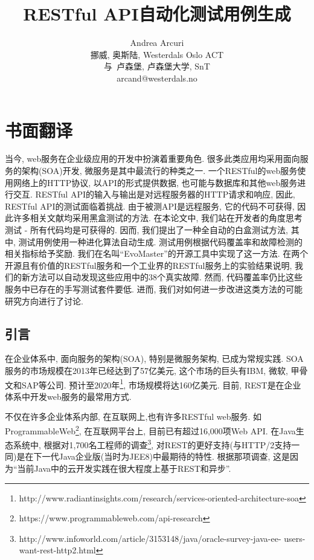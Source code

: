 \chapter{书面翻译}

\title{RESTful API自动化测试用例生成}

\author{Andrea Arcuri\\挪威, 奥斯陆, Westerdals Oslo ACT\\与\ 卢森堡, 卢森堡大学, SnT\\ arcand@westerdals.no}

\begin{cabstract}
当今, web服务在企业级应用的开发中扮演着重要角色. 很多此类应用均采用面向服务的架构(SOA)开发, 微服务是其中最流行的种类之一. 一个RESTful的web服务使用网络上的HTTP协议, 以API的形式提供数据, 也可能与数据库和其他web服务进行交互. RESTful API的输入与输出是对远程服务器的HTTP请求和响应, 因此, RESTful API的测试面临着挑战. 由于被测API是远程服务, 它的代码不可获得, 因此许多相关文献均采用黑盒测试的方法. 在本论文中, 我们站在开发者的角度思考测试 - 所有代码均是可获得的. 因而, 我们提出了一种全自动的白盒测试方法, 其中, 测试用例使用一种进化算法自动生成. 测试用例根据代码覆盖率和故障检测的相关指标给予奖励. 我们在名叫“EvoMaster”的开源工具中实现了这一方法. 在两个开源且有价值的RESTful服务和一个工业界的RESTful服务上的实验结果说明, 我们的新方法可以自动发现这些应用中的38个真实故障. 然而, 代码覆盖率仍比这些服务中已存在的手写测试套件要低. 进而, 我们对如何进一步改进这类方法的可能研究方向进行了讨论.
\end{cabstract}



\section{引言}
在企业体系中, 面向服务的架构(SOA), 特别是微服务架构\cite{newman2015building}, 已成为常规实践. SOA服务的市场规模在2013年已经达到了57亿美元, 这个市场的巨头有IBM, 微软, 甲骨文和SAP等公司. 预计至2020年\footnote{http://www.radiantinsights.com/research/services-oriented-architecture-soa}, 市场规模将达160亿美元. 目前, REST\cite{fielding2000architectural}是在企业体系中开发web服务的最常用方式. 

不仅在许多企业体系内部, 在互联网上,也有许多RESTful web服务. 如ProgrammableWeb\footnote{https://www.programmableweb.com/api-research}, 在互联网平台上, 目前已有超过16,000项Web API. 在Java生态系统中, 根据对1,700名工程师的调查\footnote{http://www.infoworld.com/article/3153148/java/oracle-survey-java-ee-
users-want-rest-http2.html}, 对REST的更好支持(与HTTP/2支持一同)是在下一代Java企业版(当时为JEE8)中最期待的特性. 根据那项调查, 这是因为“当前Java中的云开发实践在很大程度上基于REST和异步”. 

